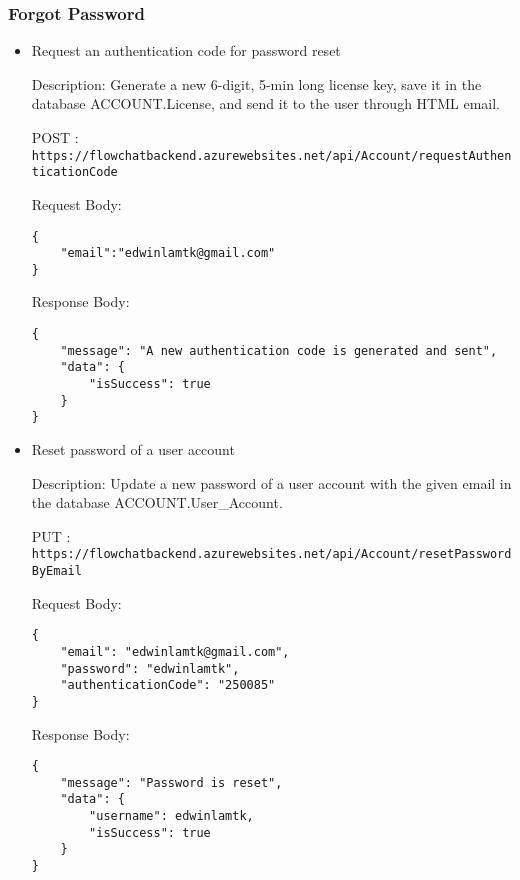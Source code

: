 \documentclass[11pt, a4paper]{article}
\begin{document}
\subsubsection{Forgot Password}
\begin{itemize}

\item Request an authentication code for password reset

Description: Generate a new 6-digit, 5-min long license key, save it in the database ACCOUNT.License, and send it to the user through HTML email.

POST :  \texttt{https://flowchatbackend.azurewebsites.net/api/Account/requestAuthenticationCode}
    
Request Body:
    \begin{lstlisting}[breaklines=true, frame=single]
{
    "email":"edwinlamtk@gmail.com"
}
    \end{lstlisting}

    Response Body:
    \begin{lstlisting}[breaklines=true, frame=single]
{
    "message": "A new authentication code is generated and sent",
    "data": {
        "isSuccess": true
    }
}
    \end{lstlisting}

\item Reset password of a user account

Description: Update a new password of a user account with the given email in the database
ACCOUNT.User\_Account.

PUT :  \texttt{https://flowchatbackend.azurewebsites.net/api/Account/resetPasswordByEmail}
    
Request Body:
    \begin{lstlisting}[breaklines=true, frame=single]
{
    "email": "edwinlamtk@gmail.com",
    "password": "edwinlamtk",
    "authenticationCode": "250085"
}
    \end{lstlisting}

    Response Body:
    \begin{lstlisting}[breaklines=true, frame=single]
{
    "message": "Password is reset",
    "data": {
        "username": edwinlamtk,
        "isSuccess": true
    }
}
    \end{lstlisting}

\end{itemize}
\end{document}
